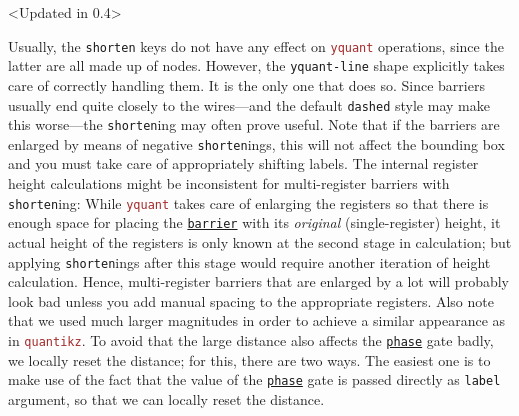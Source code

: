 \documentclass{scrartcl}
\makeatletter
\newenvironment{codeexample*}{%
   \VerbatimEnvironment%
   \let\FVB@VerbatimOut\minted@FVB@VerbatimOut
   \let\FVE@VerbatimOut\minted@FVE@VerbatimOut
   \minted@configlang{tex}%
   \minted@fvset
   \begin{VerbatimOut}[codes={\catcode`\^^I=12},firstline,lastline]{\minted@jobname.pyg}%
}{
   \end{VerbatimOut}%
   \minted@langlinenoson%
   \begin{adjustbox}{center}
       \minted@jobname.pyg %
   \end{adjustbox}\nopagebreak
   \minted@pygmentize{\minted@lang}%
   \minted@langlinenosoff%
   \par%
}
\def\pkg#1{\textcolor{brown}{\texttt{#1}}}
\def\gate#1{\hyperref[gate:#1]{\texttt{#1}}}
\def\Yquant{\pkg{yquant}}
\makeatother
\begin{document}
            \begin{example}<Updated in 0.4>
               \begin{codeexample*}
               \end{codeexample*}
               Usually, the \texttt{shorten} keys do not have any effect on \Yquant{} operations, since the latter are all made up of nodes.
               However, the \texttt{yquant-line} shape explicitly takes care of correctly handling them.
               It is the only one that does so.
               Since barriers usually end quite closely to the wires---and the default \texttt{dashed} style may make this worse---the \texttt{shorten}ing may often prove useful.
               Note that if the barriers are enlarged by means of negative \texttt{shorten}ings, this will not affect the bounding box and you must take care of appropriately shifting labels.
               The internal register height calculations might be inconsistent for multi\hyp register barriers with \texttt{shorten}ing: While \Yquant{} takes care of enlarging the registers so that there is enough space for placing the \gate{barrier} with its \emph{original} (single\hyp register) height, it actual height of the registers is only known at the second stage in calculation; but applying \texttt{shorten}ings after this stage would require another iteration of height calculation.
               Hence, multi\hyp register barriers that are enlarged by a lot will probably look bad unless you add manual spacing to the appropriate registers.
               Also note that we used much larger magnitudes in order to achieve a similar appearance as in \pkg{quantikz}.
               To avoid that the large distance also affects the \gate{phase} gate badly, we locally reset the distance; for this, there are two ways.
               The easiest one is to make use of the fact that the value of the \gate{phase} gate is passed directly as \texttt{label} argument, so that we can locally reset the distance.

\end{example}
\end{document}
